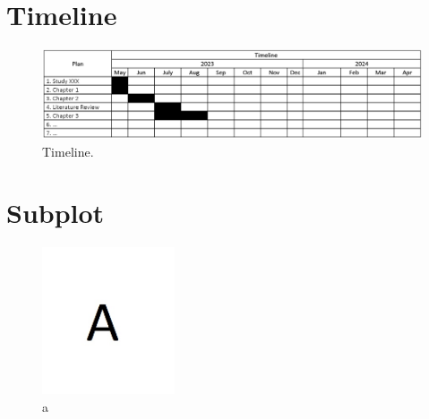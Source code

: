 \documentclass[a4paper]{report} %
\begin{document}
	\section{Timeline}
		\begin{figure}[!h]
			\noindent\Centering
			\includegraphics[width=1\textwidth]{Timeline}
			\caption{Timeline.}
			\label{fig:Project timeline}
		\end{figure}
			
	\section{Subplot}
		\begin{figure}[!h]
			\noindent\Centering
			\includegraphics[width=0.35\textwidth]{a}
			\caption{a}
			\label{fig:A}
		\end{figure}
\end{document}
